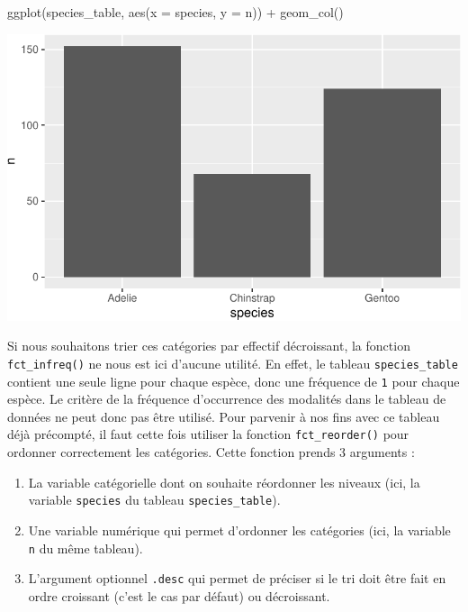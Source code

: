 \documentclass[
  a4paper,
  DIV=11,
  numbers=noendperiod,
  oneside]{scrreprt}
\newenvironment{Shaded}{}{}
\newcommand{\AttributeTok}[1]{\textcolor[rgb]{0.84,0.23,0.29}{#1}}
\newcommand{\FunctionTok}[1]{\textcolor[rgb]{0.44,0.26,0.76}{#1}}
\newcommand{\NormalTok}[1]{\textcolor[rgb]{0.14,0.16,0.18}{#1}}
\newcommand{\SpecialCharTok}[1]{\textcolor[rgb]{0.00,0.36,0.77}{#1}}
\providecommand{\tightlist}{%
  \setlength{\itemsep}{0pt}\setlength{\parskip}{0pt}}\usepackage{longtable,booktabs,array}
\begin{document}
\begin{Shaded}
\begin{Highlighting}[]
\FunctionTok{ggplot}\NormalTok{(species\_table, }\FunctionTok{aes}\NormalTok{(}\AttributeTok{x =}\NormalTok{ species, }\AttributeTok{y =}\NormalTok{ n)) }\SpecialCharTok{+}
  \FunctionTok{geom\_col}\NormalTok{()}
\end{Highlighting}
\end{Shaded}

\includegraphics{03-visualization_files/figure-pdf/unnamed-chunk-42-1.pdf}

Si nous souhaitons trier ces catégories par effectif décroissant, la
fonction \texttt{fct\_infreq()} ne nous est ici d'aucune utilité. En
effet, le tableau \texttt{species\_table} contient une seule ligne pour
chaque espèce, donc une fréquence de \texttt{1} pour chaque espèce. Le
critère de la fréquence d'occurrence des modalités dans le tableau de
données ne peut donc pas être utilisé. Pour parvenir à nos fins avec ce
tableau déjà précompté, il faut cette fois utiliser la fonction
\texttt{fct\_reorder()} pour ordonner correctement les catégories. Cette
fonction prends 3 arguments :

\begin{enumerate}
\def\labelenumi{\arabic{enumi}.}
\tightlist
\item
  La variable catégorielle dont on souhaite réordonner les niveaux (ici,
  la variable \texttt{species} du tableau \texttt{species\_table}).
\item
  Une variable numérique qui permet d'ordonner les catégories (ici, la
  variable \texttt{n} du même tableau).
\item
  L'argument optionnel \texttt{.desc} qui permet de préciser si le tri
  doit être fait en ordre croissant (c'est le cas par défaut) ou
  décroissant.
\end{enumerate}
\end{document}
